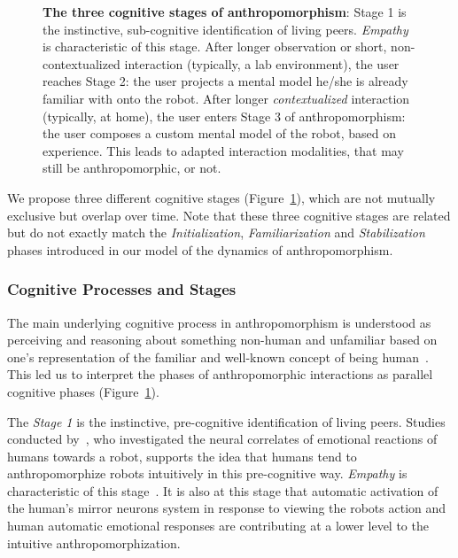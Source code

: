 \documentclass{frontiersSCNS} %
\begin{document}
\begin{figure}[htb]
\caption{\textbf{The three cognitive stages of anthropomorphism}: Stage 1 is the instinctive,
sub-cognitive identification of living peers. {\it Empathy} is characteristic
of this stage. After longer observation or short, non-contextualized interaction
(typically, a lab environment), the user reaches Stage 2: the user projects a
mental model he/she is already familiar with onto the robot. After longer {\it
contextualized} interaction (typically, at home), the user enters Stage 3 of
anthropomorphism: the user composes a custom mental model of the robot,
based on experience. This leads to adapted interaction modalities, that may
still be anthropomorphic, or not.}
\label{fig:cognitivemodel}
\end{figure}

We propose three different cognitive stages (Figure~\ref{fig:cognitivemodel}),
which are not mutually exclusive but overlap over time. Note that these three
cognitive stages are related but do not exactly match the \emph{Initialization},
\emph{Familiarization} and \emph{Stabilization} phases introduced in our model
of the dynamics of anthropomorphism.


\subsubsection{Cognitive Processes and Stages\\}

The main underlying cognitive process in anthropomorphism is understood as
perceiving and reasoning about something non-human and unfamiliar based on one's
representation of the familiar and well-known concept of being
human~\citep{epley_when_2008}. This led us to interpret the phases of
anthropomorphic interactions as parallel cognitive phases
(Figure~\ref{fig:cognitivemodel}).

The \emph{Stage 1} is the instinctive, pre-cognitive identification of living
peers. Studies conducted by~\citet{rosenthal-vonderputten_experimental_2013},
who investigated the neural correlates of emotional reactions of humans towards
a robot, supports the idea that humans tend to anthropomorphize robots
intuitively in this pre-cognitive way. {\it Empathy} is characteristic of this
stage~\citep{rosenthalvonderPutten2013neural}.  It is also at this stage that
automatic activation of the human's mirror neurons system  in response to
viewing the robots action and human automatic emotional responses are
contributing at a lower level to the intuitive anthropomorphization.
\end{document}

